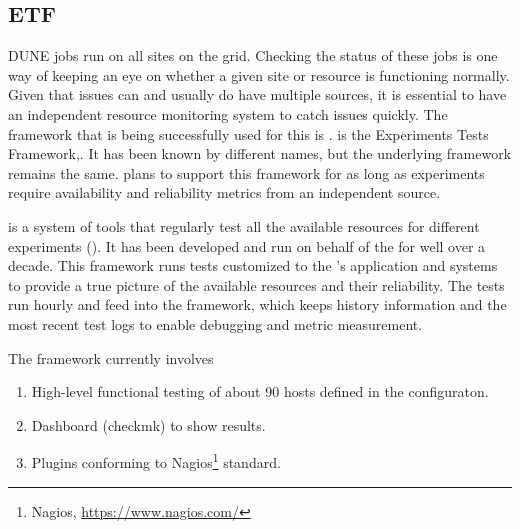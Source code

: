 \documentclass[../main-v1.tex]{subfiles}
\begin{document}
\subsection{ETF}

DUNE jobs run on all sites on the grid. Checking the status of these jobs is one way of keeping an eye on whether a given site or resource is functioning normally. Given that issues can and usually do have multiple sources, it is essential to have an independent resource monitoring system to %
catch issues quickly. The framework that is being successfully used for this is . %
 is the  %
 Experiments Tests Framework\cite{bib:ETFDoc},\cite{bib:ETFStatus}. It  has been known by different names, but the underlying framework remains the same.  plans to support this framework for as long as  experiments require availability and reliability metrics from an independent source.
 
 is a system of tools that regularly test all the available resources for different experiments (). It has been developed and run on behalf of the  %
  for well over a decade. %
This framework runs tests customized to the 's application and systems to provide a true picture of the  available resources and their reliability. The  tests run hourly and feed into the  
framework, which keeps history information and the most recent test logs to enable debugging and metric measurement.

The  framework currently involves 
\begin{enumerate}
\item High-level functional testing of about 90 hosts defined in the  configuraton.
\item Dashboard (checkmk) to show results.
\item Plugins conforming to Nagios\footnote{Nagios\textregistered, \url{https://www.nagios.com/}} standard. 
\end{enumerate}
\end{document}
